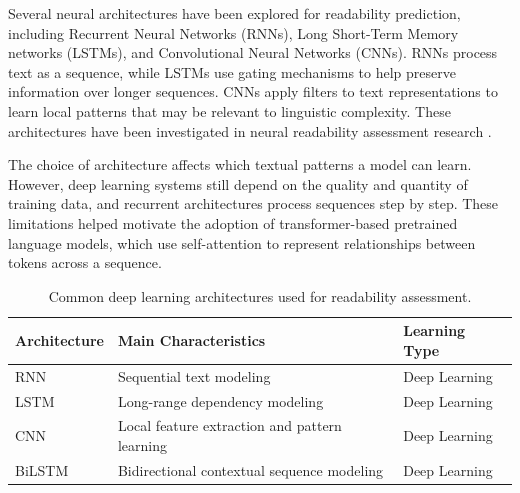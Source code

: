 \documentclass[12pt]{report}
\begin{document}
Several neural architectures have been explored for readability prediction, including Recurrent Neural Networks (RNNs), Long Short-Term Memory networks (LSTMs), and Convolutional Neural Networks (CNNs). RNNs process text as a sequence, while LSTMs use gating mechanisms to help preserve information over longer sequences. CNNs apply filters to text representations to learn local patterns that may be relevant to linguistic complexity. These architectures have been investigated in neural readability assessment research \cite{martinc2021supervised}.

The choice of architecture affects which textual patterns a model can learn. However, deep learning systems still depend on the quality and quantity of training data, and recurrent architectures process sequences step by step. These limitations helped motivate the adoption of transformer-based pretrained language models, which use self-attention to represent relationships between tokens across a sequence.


\begin{table}[H]

\centering

\caption{Common deep learning architectures used for readability assessment.}

\label{tab:deep_learning_readability}
\vspace{3mm}
\begin{tabular}{p{4cm} p{7cm} p{2.5cm}}

\toprule

\textbf{Architecture} & \textbf{Main Characteristics} & \textbf{Learning Type} \\

\midrule

RNN & Sequential text modeling & Deep Learning \\

LSTM & Long-range dependency modeling & Deep Learning \\

CNN & Local feature extraction and pattern learning & Deep Learning \\

BiLSTM & Bidirectional contextual sequence modeling & Deep Learning \\

\bottomrule

\end{tabular}

\end{table}
\end{document}

